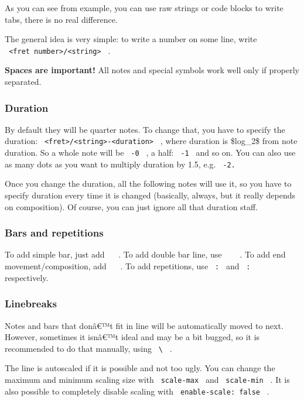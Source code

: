 As you can see from example, you can use raw strings or code blocks to
write tabs, there is no real difference.

The general idea is very simple: to write a number on some line, write
\texttt{\ \textless{}fret\ number\textgreater{}/\textless{}string\textgreater{}\ }
.

\textbf{Spaces are important!} All notes and special symbols work well
only if properly separated.

\subsubsection{Duration}\label{duration}

By default they will be quarter notes. To change that, you have to
specify the duration:
\texttt{\ \textless{}fret\textgreater{}/\textless{}string\textgreater{}-\textless{}duration\textgreater{}\ }
, where duration is \$log\_2\$ from note duration. So a whole note will
be \texttt{\ -0\ } , a half: \texttt{\ -1\ } and so on. You can also use
as many dots as you want to multiply duration by 1.5, e.g.
\texttt{\ -2.\ }

Once you change the duration, all the following notes will use it, so
you have to specify duration every time it is changed (basically,
always, but it really depends on composition). Of course, you can just
ignore all that duration staff.

\subsubsection{Bars and repetitions}\label{bars-and-repetitions}

To add simple bar, just add \texttt{\ \textbar{}\ } . To add double bar
line, use \texttt{\ \textbar{}\ \textbar{}\ } . To add end
movement/composition, add \texttt{\ \textbar{}\textbar{}\ } . To add
repetitions, use \texttt{\ \textbar{}:\ } and \texttt{\ :\textbar{}\ }
respectively.

\subsubsection{Linebreaks}\label{linebreaks}

Notes and bars that donâ€™t fit in line will be automatically moved to
next. However, sometimes it isnâ€™t ideal and may be a bit bugged, so it
is recommended to do that manually, using \texttt{\ \textbackslash{}\ }
.

The line is autoscaled if it is possible and not too ugly. You can
change the maximum and minimum scaling size with \texttt{\ scale-max\ }
and \texttt{\ scale-min\ } . It is also possible to completely disable
scaling with \texttt{\ enable-scale:\ false\ } .

